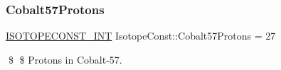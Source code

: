 \subsubsection{\texorpdfstring{Cobalt57\+Protons}{Cobalt57Protons}}
{\footnotesize\ttfamily \mbox{\hyperlink{group___isotope_const-_macros_ga5f18360b3e99483a35c32d789e62621c}{I\+S\+O\+T\+O\+P\+E\+C\+O\+N\+S\+T\+\_\+\+I\+NT}} Isotope\+Const\+::\+Cobalt57\+Protons = 27}

\$ \$ Protons in Cobalt-\/57. 